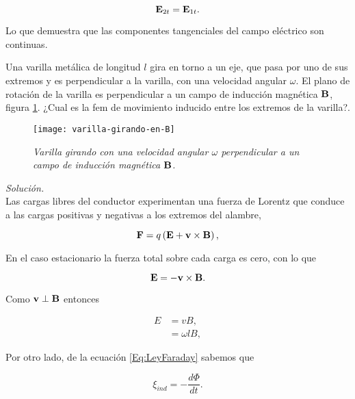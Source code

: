 \begin{equation}
	\label{eq:CampoETangencial}
	\textbf{E}_{2t} = \textbf{E}_{1t}.
\end{equation}

Lo que demuestra que las componentes tangenciales del campo eléctrico son continuas.



\begin{example}
	Una varilla metálica de longitud $l$ gira en torno a un eje, que pasa por uno de sus extremos y es perpendicular a la varilla, con una velocidad angular $\omega$. El plano de rotación de la varilla es perpendicular a un campo de inducción magnética $\textbf{B}$, figura \ref{Fig:VarillaGirandoEnB}. ¿Cual es la fem de movimiento inducido entre los extremos de la varilla?.

	\begin{figure}[H]
		\centering
		\texttt{[image: varilla-girando-en-B]}
		\caption{\emph{Varilla girando con una velocidad angular $\omega$ perpendicular a un campo de inducción magnética $\textbf{B}$.}}
		\label{Fig:VarillaGirandoEnB}
	\end{figure}

	\emph{Solución.}\\
	Las cargas libres del conductor experimentan una fuerza de Lorentz que conduce a las cargas positivas y negativas a los extremos del alambre,

	\begin{equation*}
		\textbf{F} = q \left( \textbf{E} + \textbf{v} \times \textbf{B} \right),
	\end{equation*}

	En el caso estacionario la fuerza total sobre cada carga es cero, con lo que

	\begin{equation}
		\textbf{E} = -\textbf{v} \times \textbf{B}.
	\end{equation}

	Como $\textbf{v} \perp \textbf{B}$ entonces

	\begin{align}
		\label{Eq:EConFuerzaElectrica}
		E & = vB, \nonumber \\
		  & = \omega lB,
	\end{align}

	Por otro lado, de la ecuación \eqref{Eq:LeyFaraday} sabemos que

	\begin{equation*}
		\xi_{ind} = -\frac{d\Phi}{dt}.
	\end{equation*}


\end{example}
